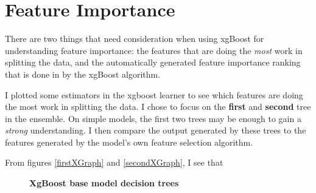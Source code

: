 \section*{Feature Importance}
There are two things that need consideration when using xgBoost for understanding feature importance: the features that are doing the \emph{most} work in splitting the data, and the automatically generated feature importance ranking that is done in by the xgBoost algorithm.

I plotted some estimators in the xgboost learner to see which features are doing the most work in splitting the data. I chose to focus on the \textbf{first} and \textbf{second} tree in the ensemble. On simple models, the first two trees may be enough to gain a \textit{strong} understanding. I then compare the output generated by these trees to the features generated by the model's own feature selection algorithm. 

From figures \ref{firstXGraph} and \ref{secondXGraph}, I see that 


\begin{figure}[!hbtp]
\centering


    \caption{\textbf{XgBoost base model decision trees}}
\end{figure}


